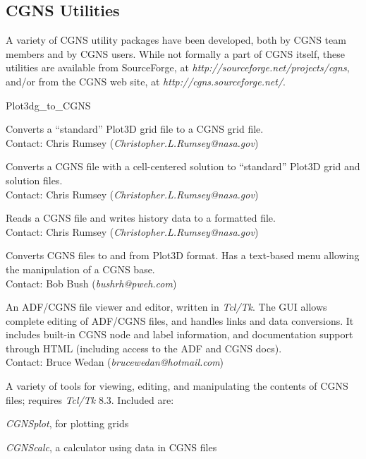 \newpage
\subsection{CGNS Utilities}

A variety of CGNS utility packages have been developed, both by CGNS
team members and by CGNS users.
While not formally a part of CGNS itself, these utilities are available
from SourceForge, at \textit{http://sourceforge.net/projects/cgns},
and/or from the CGNS web site, at \textit{http://cgns.sourceforge.net/}.

\begin{Ventryi}{Plot3dg\_to\_CGNS}
\item [Plot3dg\_to\_CGNS]
      Converts a ``standard'' Plot3D grid file to a CGNS grid file.\\
      Contact: Chris Rumsey (\textit{Christopher.L.Rumsey@nasa.gov})
\item [CGNS\_to\_Plot3d]
      Converts a CGNS file with a cell-centered solution to ``standard''
      Plot3D grid and solution files.\\
      Contact: Chris Rumsey (\textit{Christopher.L.Rumsey@nasa.gov})
\item [CGNS\_readhist]
      Reads a CGNS file and writes history data to a formatted file.\\
      Contact: Chris Rumsey (\textit{Christopher.L.Rumsey@nasa.gov})
\item [FTU]
      Converts CGNS files to and from Plot3D format.
      Has a text-based menu allowing the manipulation of a CGNS base.\\
      Contact: Bob Bush (\textit{bushrh@pweh.com})
\item [ADFviewer]
      An ADF/CGNS file viewer and editor, written in \textit{Tcl/Tk}.
      The GUI allows complete editing of ADF/CGNS files, and handles
      links and data conversions.
      It includes built-in CGNS node and label information, and
      documentation support through HTML (including access to the ADF
      and CGNS docs).\\
      Contact: Bruce Wedan (\textit{brucewedan@hotmail.com})
\item [CGNS Tools]
      A variety of tools for viewing, editing, and manipulating the
      contents of CGNS files; requires \textit{Tcl/Tk} 8.3.
      Included are:
      \begin{itemize*}
      \item \textit{CGNSplot}, for plotting grids
      \item \textit{CGNScalc}, a calculator using data in CGNS files

\end{itemize*}
\end{Ventryi}
